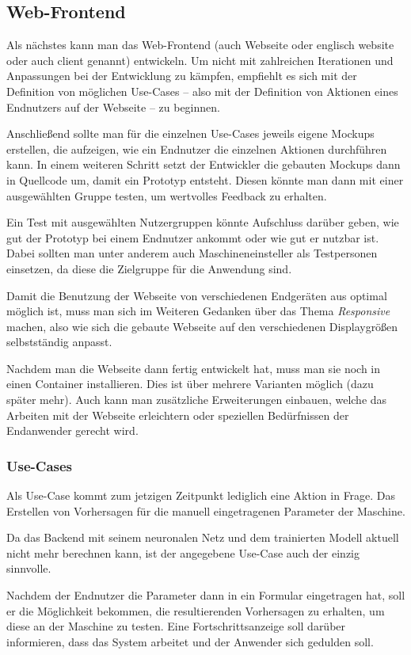 \subsection{Web-Frontend}
\label{subsec:webseite}
Als nächstes kann man das Web-Frontend (auch Webseite oder englisch website oder auch client genannt) entwickeln. Um
nicht mit zahlreichen Iterationen und Anpassungen bei der Entwicklung zu kämpfen, empfiehlt es sich mit der Definition
von möglichen Use-Cases -- also mit der Definition von Aktionen eines Endnutzers auf der Webseite -- zu beginnen.

Anschließend sollte man für die einzelnen Use-Cases jeweils eigene Mockups erstellen, die aufzeigen, wie ein Endnutzer
die einzelnen Aktionen durchführen kann. In einem weiteren Schritt setzt der Entwickler die gebauten Mockups dann in
Quellcode um, damit ein Prototyp entsteht. Diesen könnte man dann mit einer ausgewählten Gruppe testen, um wertvolles
Feedback zu erhalten.

Ein Test mit ausgewählten Nutzergruppen könnte Aufschluss darüber geben, wie gut der Prototyp bei einem Endnutzer
ankommt oder wie gut er nutzbar ist. Dabei sollten man unter anderem auch Maschineneinsteller als Testpersonen
einsetzen, da diese die Zielgruppe für die Anwendung sind.

Damit die Benutzung der Webseite von verschiedenen Endgeräten aus optimal möglich ist, muss man sich im Weiteren
Gedanken über das Thema \textit{Responsive} machen, also wie sich die gebaute Webseite auf den verschiedenen
Displaygrößen selbstständig anpasst.

Nachdem man die Webseite dann fertig entwickelt hat, muss man sie noch in einen Container installieren. Dies ist über
mehrere Varianten möglich (dazu später mehr). Auch kann man zusätzliche Erweiterungen einbauen, welche das Arbeiten mit
der Webseite erleichtern oder speziellen Bedürfnissen der Endanwender gerecht wird.

\subsubsection{Use-Cases}
Als Use-Case kommt zum jetzigen Zeitpunkt lediglich eine Aktion in Frage. Das Erstellen von Vorhersagen für die manuell
eingetragenen Parameter der Maschine.

Da das Backend mit seinem neuronalen Netz und dem trainierten Modell aktuell nicht mehr berechnen kann, ist der
angegebene Use-Case auch der einzig sinnvolle.

Nachdem der Endnutzer die Parameter dann in ein Formular eingetragen hat, soll er die Möglichkeit bekommen, die
resultierenden Vorhersagen zu erhalten, um diese an der Maschine zu testen. Eine Fortschrittsanzeige soll darüber
informieren, dass das System arbeitet und der Anwender sich gedulden soll.

